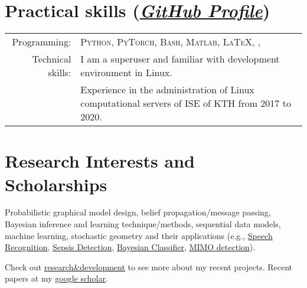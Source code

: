 \documentclass[a4paper,10pt]{article}
\begin{document}

\section{Practical skills (\href{https://github.com/FirstHandScientist}{\textit{GitHub Profile}})}

\begin{tabular}{rp{12cm}}
  Programming:       & \textsc{Python, PyTorch, Bash, Matlab, \LaTeX, },  \vspace{5pt}\\
	Technical skills:  & I am a superuser and familiar with development environment in Linux. \\
                     & Experience in the administration of Linux computational servers of ISE of KTH from 2017 to 2020.\\

\end{tabular}

\section{Research Interests and Scholarships}
Probabilistic graphical model design, belief propagation/message passing, Bayesian inference and learning technique/methods, sequential data models, machine learning, stochastic geometry and their applications (e.g., \href{https://github.com/FirstHandScientist/genhmm}{Speech Recognition}, \href{https://ieeexplore.ieee.org/abstract/document/9054635}{Sepsis Detection}, \href{https://github.com/FirstHandScientist/classification-EM-GM}{Bayesian Classifier}, \href{https://arxiv.org/abs/2007.05703}{MIMO detection}).

Check out \href{https://firsthandscientist.github.io/#/research}{research\&development} to see more about my recent projects. Recent papers at my \href{https://scholar.google.com/citations?hl=en&user=eK9LoQMAAAAJ&view_op=list_works&sortby=pubdate}{google scholar}.
\end{document}
